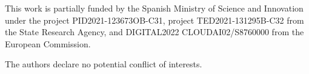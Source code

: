 \documentclass[AMA,Times1COL]{WileyNJDv5}
\begin{document}


\maketitle

\renewcommand\thefootnote{}

\renewcommand\thefootnote{\fnsymbol{footnote}}
\setcounter{footnote}{1}









This work is partially funded by the Spanish Ministry of Science and Innovation under the project PID2021-123673OB-C31, project TED2021-131295B-C32 from the State Research Agency, and DIGITAL2022 CLOUDAI02/S8760000 from the European Commission. 




The authors declare no potential conflict of interests.


\end{document}
